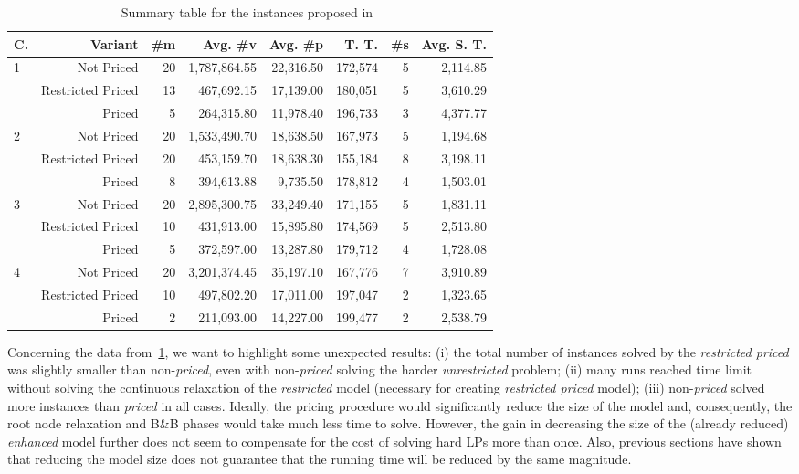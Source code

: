 \documentclass[ppgc,prop-tese,english,formais,babel]{iiufrgs}
\begin{document}
\begin{table}
\centering
\caption{Summary table for the instances proposed in~\citet{velasco:2019}}
\begin{tabular}{lrrrrrrr}
\hline\hline
C. & Variant & \#m & Avg. \#v & Avg. \#p & T. T. & \#s & Avg. S. T. \\\hline
\multirow{3}{*}{1} & Not Priced & 20 & 1,787,864.55 & 22,316.50 & 172,574 & 5 & 2,114.85 \\
                   & Restricted Priced & 13 & 467,692.15 & 17,139.00 & 180,051 & 5 & 3,610.29 \\
\vspace{1.5mm}     & Priced & 5 & 264,315.80 & 11,978.40 & 196,733 & 3 & 4,377.77 \\
\multirow{3}{*}{2} & Not Priced & 20 & 1,533,490.70 & 18,638.50 & 167,973 & 5 & 1,194.68 \\
                   & Restricted Priced & 20 & 453,159.70 & 18,638.30 & 155,184 & 8 & 3,198.11 \\
\vspace{1.5mm}     & Priced & 8 & 394,613.88 & 9,735.50 & 178,812 & 4 & 1,503.01 \\
\multirow{3}{*}{3} & Not Priced & 20 & 2,895,300.75 & 33,249.40 & 171,155 & 5 & 1,831.11 \\
                   & Restricted Priced & 10 & 431,913.00 & 15,895.80 & 174,569 & 5 & 2,513.80 \\
\vspace{1.5mm}     & Priced & 5 & 372,597.00 & 13,287.80 & 179,712 & 4 & 1,728.08 \\
\multirow{3}{*}{4} & Not Priced & 20 & 3,201,374.45 & 35,197.10 & 167,776 & 7 & 3,910.89 \\
                   & Restricted Priced & 10 & 497,802.20 & 17,011.00 & 197,047 & 2 & 1,323.65 \\
                   & Priced & 2 & 211,093.00 & 14,227.00 & 199,477 & 2 & 2,538.79 \\\hline\hline
\end{tabular}
\label{tab:velasco_summary}
\end{table}

Concerning the data from~\cref{tab:velasco_summary}, we want to highlight some unexpected results:
(i) the total number of instances solved by the \emph{restricted priced} was slightly smaller than non-\emph{priced}, even with non-\emph{priced} solving the harder \emph{unrestricted} problem;
(ii) many runs reached time limit without solving the continuous relaxation of the \emph{restricted} model (necessary for creating \emph{restricted priced} model);
(iii) non-\emph{priced} solved more instances than \emph{priced} in all cases.
Ideally, the pricing procedure would significantly reduce the size of the model and, consequently, the root node relaxation and B\&B phases would take much less time to solve.
However, the gain in decreasing the size of the (already reduced) \emph{enhanced} model further does not seem to compensate for the cost of solving hard LPs more than once.
Also, previous sections have shown that reducing the model size does not guarantee that the running time will be reduced by the same magnitude.
\end{document}
